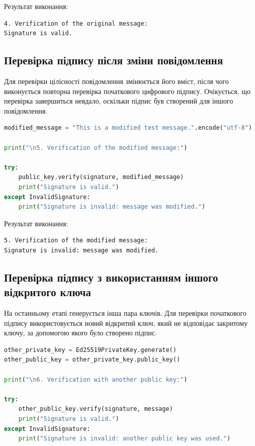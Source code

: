 Результат виконання:

\begin{lstlisting}
4. Verification of the original message:
Signature is valid.
\end{lstlisting}


\subsection{Перевірка підпису після зміни повідомлення}

Для перевірки цілісності повідомлення змінюється його вміст, після чого виконується повторна перевірка початкового 
цифрового підпису. Очікується, що перевірка завершиться невдало, оскільки підпис був створений для іншого повідомлення.

\begin{lstlisting}[language=Python]
modified_message = "This is a modified test message.".encode("utf-8")

print("\n5. Verification of the modified message:")

try:
    public_key.verify(signature, modified_message)
    print("Signature is valid.")
except InvalidSignature:
    print("Signature is invalid: message was modified.")
\end{lstlisting}

Результат виконання:

\begin{lstlisting}
5. Verification of the modified message:
Signature is invalid: message was modified.
\end{lstlisting}


\subsection{Перевірка підпису з використанням іншого відкритого ключа}

На останньому етапі генерується інша пара ключів. Для перевірки початкового підпису використовується новий відкритий ключ, 
який не відповідає закритому ключу, за допомогою якого було створено підпис.

\begin{lstlisting}[language=Python]
other_private_key = Ed25519PrivateKey.generate()
other_public_key = other_private_key.public_key()

print("\n6. Verification with another public key:")

try:
    other_public_key.verify(signature, message)
    print("Signature is valid.")
except InvalidSignature:
    print("Signature is invalid: another public key was used.")
\end{lstlisting}

